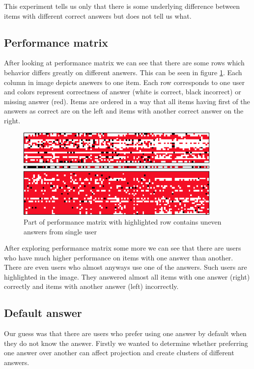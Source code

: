 \documentclass[
  digital, %
  table,   %
  nolof,     %
  nolot,     %
  nocover,
  color,
  final, %
]{fithesis3}
\begin{document}
This experiment tells us only that there is some underlying difference between items with different correct answers but does not tell us what.


\subsection{Performance matrix}\label{performance-matrix}

After looking at performance matrix we can see that there are some rows which behavior differs greatly on different answers. This can be seen in figure \ref{fig:performance_matrix}. Each column in image depicts answers to one item. Each row corresponds to one user and colors represent correctness of answer (white is correct, black incorrect) or missing answer (red). Items are ordered in a way that all items having first of the answers as correct are on the left and items with another correct answer on the right.

\begin{figure}
  \includegraphics[width=10cm]{img/performance_matrix}
  \caption{Part of performance matrix with highlighted row contains uneven answers from single user}
  \label{fig:performance_matrix}
\end{figure}

After exploring performance matrix some more we can see that there are users who have much higher performance on items with one answer than another. There are even users who almost anyways use one of the answers. Such users are highlighted in the image. They answered almost all items with one answer (right) correctly and items with another answer (left) incorrectly.


\subsection{Default answer}\label{default-answer}

Our guess was that there are users who prefer using one answer by default when they do not know the answer. Firstly we wanted to determine whether preferring one answer over another can affect projection and create clusters of different answers.
\end{document}

